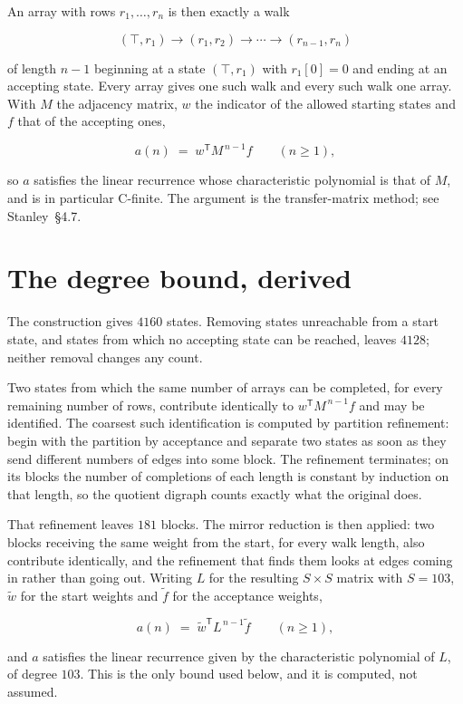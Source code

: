 \documentclass[11pt]{article}
\theoremstyle{definition}
\begin{document}
An array with rows $r_1,\dots,r_n$ is then exactly a walk

\[(\top,r_1) \to (r_1,r_2) \to \cdots \to (r_{n-1},r_n)\]

of length $n-1$ beginning at a state $(\top,r_1)$ with $r_1[0]=0$ and ending at an accepting state. Every array gives one such walk and every such walk one array. With $M$ the adjacency matrix, $w$ the indicator of the allowed starting states and $f$ that of the accepting ones,

\[a(n) \;=\; w^{\mathsf T} M^{\,n-1} f \qquad (n \ge 1),\]

so $a$ satisfies the linear recurrence whose characteristic polynomial is that of $M$, and is in particular C-finite. The argument is the transfer-matrix method; see Stanley~\S4.7.

\section{The degree bound, derived}

The construction gives $4160$ states. Removing states unreachable from a start state, and states from which no accepting state can be reached, leaves $4128$; neither removal changes any count.

Two states from which the same number of arrays can be completed, for every remaining number of rows, contribute identically to $w^{\mathsf T}M^{\,n-1}f$ and may be identified. The coarsest such identification is computed by partition refinement: begin with the partition by acceptance and separate two states as soon as they send different numbers of edges into some block. The refinement terminates; on its blocks the number of completions of each length is constant by induction on that length, so the quotient digraph counts exactly what the original does.

That refinement leaves $181$ blocks. The mirror reduction is then applied: two blocks receiving the same weight from the start, for every walk length, also contribute identically, and the refinement that finds them looks at edges coming in rather than going out. Writing $L$ for the resulting $S \times S$ matrix with $S = 103$, $\tilde w$ for the start weights and $\tilde f$ for the acceptance weights,

\[a(n) \;=\; \tilde w^{\mathsf T} L^{\,n-1} \tilde f \qquad (n \ge 1),\]

and $a$ satisfies the linear recurrence given by the characteristic polynomial of $L$, of degree $103$. This is the only bound used below, and it is computed, not assumed.
\end{document}
